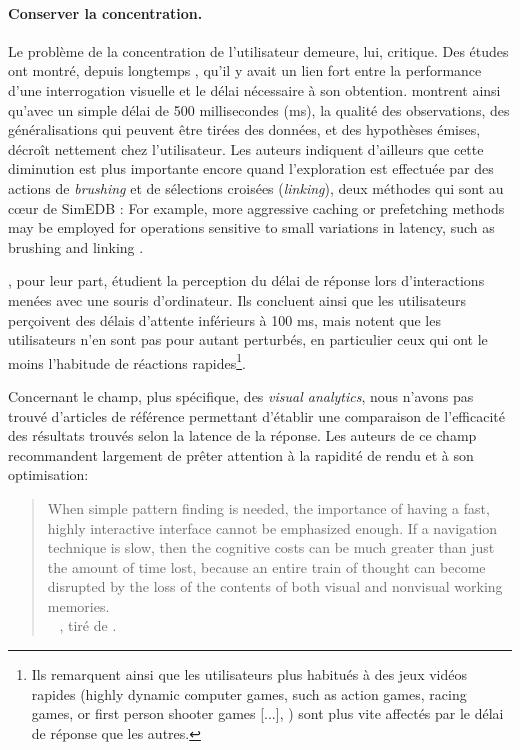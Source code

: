 \paragraph{Conserver la concentration.}

Le problème de la concentration de l'utilisateur demeure, lui, critique.
Des études ont montré, depuis longtemps \autocite{mackenzie_lag_1993}, qu'il y avait un lien fort entre la performance d'une interrogation visuelle et le délai nécessaire à son obtention.
\cite[8]{liu_effects_2014} montrent ainsi qu'avec un simple délai de 500 millisecondes (ms), la qualité des observations, des généralisations qui peuvent être tirées des données, et des hypothèses émises, décroît nettement chez l'utilisateur.
Les auteurs indiquent d'ailleurs que cette diminution est plus importante encore quand l'exploration est effectuée par des actions de \textit{brushing} et de sélections croisées (\textit{linking}), deux méthodes qui sont au cœur de SimEDB : \og For example, more aggressive caching or prefetching methods may be employed for operations sensitive to small variations in latency, such as brushing and linking \fg{} \autocite[9]{liu_effects_2014}.

\cite{forch_are_2017}, pour leur part, étudient la perception du délai de réponse lors d'interactions menées avec une souris d'ordinateur.
Ils concluent ainsi que les utilisateurs perçoivent des délais d'attente inférieurs à 100 ms, mais notent que les utilisateurs n'en sont pas pour autant perturbés, en particulier ceux qui ont le moins l'habitude de réactions rapides\footnote{
	Ils remarquent ainsi que les utilisateurs plus habitués à des jeux vidéos rapides (\og highly dynamic computer games, such as action games, racing games, or first person shooter games [...]\fg{}, \cite[51]{forch_are_2017}) sont plus vite affectés par le délai de réponse que les autres.
}.

Concernant le champ, plus spécifique, des \textit{visual analytics}, nous n'avons pas trouvé d'articles de référence permettant d'établir une comparaison de l'efficacité des résultats trouvés selon la latence de la réponse.
Les auteurs de ce champ recommandent largement de prêter attention à la rapidité de rendu et à son optimisation:
\begin{quotation}
	\noindent \og
	When simple pattern finding is needed, the importance of having a fast, highly interactive interface cannot be emphasized	enough.
	If a navigation technique is slow, then the cognitive costs can be much greater than just the amount of time lost, because an entire train of thought can become disrupted by the loss of the contents of both visual and nonvisual working memories.
	\fg{}\\
	\mbox{}~ \hfill  \cite{ware_information_2012}, tiré de \cite[12]{amirpour_amraii_human-data_2018}.
\end{quotation}

